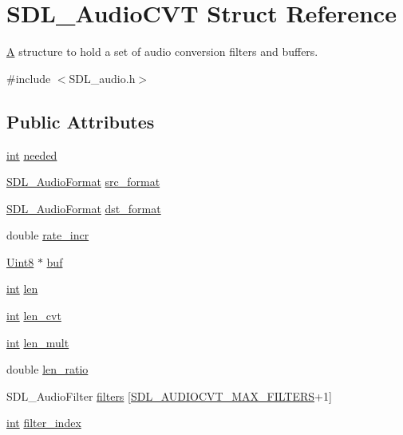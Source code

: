 \hypertarget{struct_s_d_l___audio_c_v_t}{}\section{S\+D\+L\+\_\+\+Audio\+C\+VT Struct Reference}
\label{struct_s_d_l___audio_c_v_t}


\mbox{\hyperlink{struct_a}{A}} structure to hold a set of audio conversion filters and buffers.  




{\ttfamily \#include $<$S\+D\+L\+\_\+audio.\+h$>$}

\subsection*{Public Attributes}
\begin{DoxyCompactItemize}
\item 
\mbox{\hyperlink{warnings_8h_a74f207b5aa4ba51c3a2ad59b219a423b}{int}} \mbox{\hyperlink{struct_s_d_l___audio_c_v_t_ac600a035a48df05e14d3712fd6953ad4}{needed}}
\item 
\mbox{\hyperlink{_s_d_l__audio_8h_a491ed103fd25d920c4e6b7495217ce66}{S\+D\+L\+\_\+\+Audio\+Format}} \mbox{\hyperlink{struct_s_d_l___audio_c_v_t_a6ae81231e017105e6d5e745a51732e16}{src\+\_\+format}}
\item 
\mbox{\hyperlink{_s_d_l__audio_8h_a491ed103fd25d920c4e6b7495217ce66}{S\+D\+L\+\_\+\+Audio\+Format}} \mbox{\hyperlink{struct_s_d_l___audio_c_v_t_a8f890d017be857a3b048bf00525736c6}{dst\+\_\+format}}
\item 
double \mbox{\hyperlink{struct_s_d_l___audio_c_v_t_ad886122c23a6673073baace31bff3b6c}{rate\+\_\+incr}}
\item 
\mbox{\hyperlink{_s_d_l__stdinc_8h_a2944638813a090aa23e62f4da842c3e2}{Uint8}} $\ast$ \mbox{\hyperlink{struct_s_d_l___audio_c_v_t_a080db27b929efa983c5161360ffce310}{buf}}
\item 
\mbox{\hyperlink{warnings_8h_a74f207b5aa4ba51c3a2ad59b219a423b}{int}} \mbox{\hyperlink{struct_s_d_l___audio_c_v_t_aeaeb8c5a63c3ab96471fbfdf412c78ff}{len}}
\item 
\mbox{\hyperlink{warnings_8h_a74f207b5aa4ba51c3a2ad59b219a423b}{int}} \mbox{\hyperlink{struct_s_d_l___audio_c_v_t_a5c60163f34d1947e5b166c23aba9879d}{len\+\_\+cvt}}
\item 
\mbox{\hyperlink{warnings_8h_a74f207b5aa4ba51c3a2ad59b219a423b}{int}} \mbox{\hyperlink{struct_s_d_l___audio_c_v_t_ac9662d47cf2348b82b27b151150116b0}{len\+\_\+mult}}
\item 
double \mbox{\hyperlink{struct_s_d_l___audio_c_v_t_a5628ff5ccf711de9d77c0a4a9f57d2f0}{len\+\_\+ratio}}
\item 
S\+D\+L\+\_\+\+Audio\+Filter \mbox{\hyperlink{struct_s_d_l___audio_c_v_t_afeb8dc60716644de3b681653442de1db}{filters}} \mbox{[}\mbox{\hyperlink{_s_d_l__audio_8h_a3d38380ac4a45a68a0e1c1a7a02bd290}{S\+D\+L\+\_\+\+A\+U\+D\+I\+O\+C\+V\+T\+\_\+\+M\+A\+X\+\_\+\+F\+I\+L\+T\+E\+RS}}+1\mbox{]}
\item 
\mbox{\hyperlink{warnings_8h_a74f207b5aa4ba51c3a2ad59b219a423b}{int}} \mbox{\hyperlink{struct_s_d_l___audio_c_v_t_a35093b3ad3331c17416c593a76012b63}{filter\+\_\+index}}
\end{DoxyCompactItemize}


